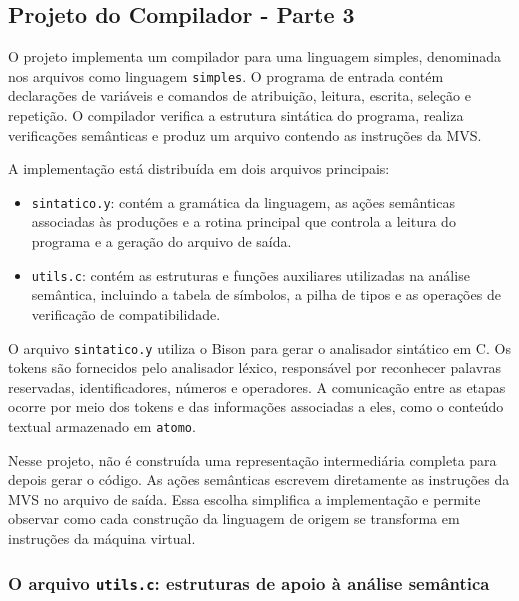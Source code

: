 \documentclass[
  brazilian,
  letterpaper,
]{book}
\providecommand{\tightlist}{%
  \setlength{\itemsep}{0pt}\setlength{\parskip}{0pt}}
\theoremstyle{plain}
\theoremstyle{definition}
\theoremstyle{remark}
\begin{document}
\subsection{Projeto do Compilador - Parte
3}\label{projeto-do-compilador---parte-3}

O projeto implementa um compilador para uma linguagem simples,
denominada nos arquivos como linguagem \texttt{simples}. O programa de
entrada contém declarações de variáveis e comandos de atribuição,
leitura, escrita, seleção e repetição. O compilador verifica a estrutura
sintática do programa, realiza verificações semânticas e produz um
arquivo contendo as instruções da MVS.

A implementação está distribuída em dois arquivos principais:

\begin{itemize}
\tightlist
\item
  \texttt{sintatico.y}: contém a gramática da linguagem, as ações
  semânticas associadas às produções e a rotina principal que controla a
  leitura do programa e a geração do arquivo de saída.
\item
  \texttt{utils.c}: contém as estruturas e funções auxiliares utilizadas
  na análise semântica, incluindo a tabela de símbolos, a pilha de tipos
  e as operações de verificação de compatibilidade.
\end{itemize}

O arquivo \texttt{sintatico.y} utiliza o Bison para gerar o analisador
sintático em C. Os tokens são fornecidos pelo analisador léxico,
responsável por reconhecer palavras reservadas, identificadores, números
e operadores. A comunicação entre as etapas ocorre por meio dos tokens e
das informações associadas a eles, como o conteúdo textual armazenado em
\texttt{atomo}.

Nesse projeto, não é construída uma representação intermediária completa
para depois gerar o código. As ações semânticas escrevem diretamente as
instruções da MVS no arquivo de saída. Essa escolha simplifica a
implementação e permite observar como cada construção da linguagem de
origem se transforma em instruções da máquina virtual.

\subsubsection{\texorpdfstring{O arquivo \texttt{utils.c}: estruturas de
apoio à análise
semântica}{O arquivo utils.c: estruturas de apoio à análise semântica}}\label{o-arquivo-utils.c-estruturas-de-apoio-uxe0-anuxe1lise-semuxe2ntica}
\end{document}
